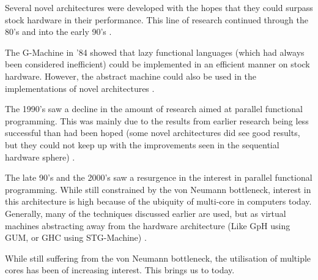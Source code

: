     Several novel architectures were developed with the hopes that they could
surpass stock hardware in their performance. This line of research continued
through the 80's and into the early 90's \citep{Alice, GRIP, clackbook,
PFPAnIntro}.

    The G-Machine in '84 showed that lazy functional languages (which had always
been considered inefficient) could be implemented in an efficient manner on
stock hardware. However, the abstract machine could also be used in the
implementations of novel architectures \citep{Augustsson:LazyMLCompiler}.

    The 1990's saw a decline in the amount of research aimed at parallel
functional programming. This was mainly due to the results from earlier research
being less successful than had been hoped (some novel architectures did see good
results, but they could not keep up with the improvements seen in the sequential
hardware sphere) \citep{PFPAnIntro, clackbook}.

    The late 90's and the 2000's saw a resurgence in the interest in parallel
functional programming. While still constrained by the von Neumann bottleneck,
interest in this architecture is high because of the ubiquity of multi-core in
computers today. Generally, many of the techniques discussed earlier are used, but as virtual
machines abstracting away from the hardware architecture (Like GpH using GUM, or
GHC using STG-Machine) \citep{buckwheat, haskellSharedMem}.


While still suffering from the von Neumann bottleneck, the
utilisation of multiple cores has been of increasing interest. This brings us to
today.

